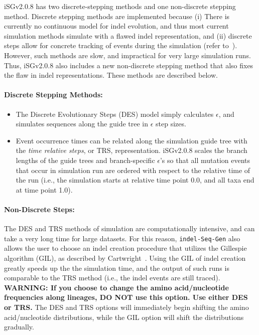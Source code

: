 \documentclass[10pt]{article}
\newcommand{\version}{2.0.8 }
\newcommand{\iSGcurrentshort}{iSGv\version }
\begin{document}
 \iSGcurrentshort has two discrete-stepping methods and one non-discrete stepping method. Discrete stepping methods are implemented because (i) There is currently no continuous model for indel evolution, and thus most current simulation methods simulate with a flawed indel representation, and (ii) discrete steps allow for concrete tracking of events during the simulation (refer to~\cite{Strope09}). However, such methods are slow, and impractical for very large simulation runs. Thus, \iSGcurrentshort also includes a new non-discrete stepping method that also fixes the flaw in indel representations. These methods are described below.
 
 \paragraph{Discrete Stepping Methods:} 
 \begin{itemize} 
 \item The Discrete Evolutionary Steps (DES) model simply calculates $\epsilon$, and simulates sequences along the guide tree in $\epsilon$ step sizes. 
 \item Event occurrence times can be related along the simulation guide tree with the \emph{time relative steps}, or TRS, representation. \iSGcurrentshort scales the branch lengths of the guide trees and branch-specific $\epsilon$'s so that all mutation events that occur in simulation run are ordered with respect to the relative time of the run (i.e., the simulation starts at relative time point 0.0, and all taxa end at time point 1.0). 
 \end{itemize}
 
 \paragraph{Non-Discrete Steps:} The DES and TRS methods of simulation are computationally intensive, and can take a very long time for large datasets. For this reason, {\tt indel-Seq-Gen} also allows the user to choose an indel creation procedure that utilizes the Gillespie algorithm (GIL), as described by Cartwright~\cite{Cartwright05}. Using the GIL of indel creation greatly speeds up the the simulation time, and the output of such runs is comparable to the TRS method (i.e., the indel events are still traced). {\bf WARNING: If you choose to change the amino acid/nucleotide frequencies along lineages, DO NOT use this option. Use either DES or TRS.} The DES and TRS options will immediately begin shifting the amino acid/nucleotide distributions, while the GIL option will shift the distributions gradually.
 
\end{document}
